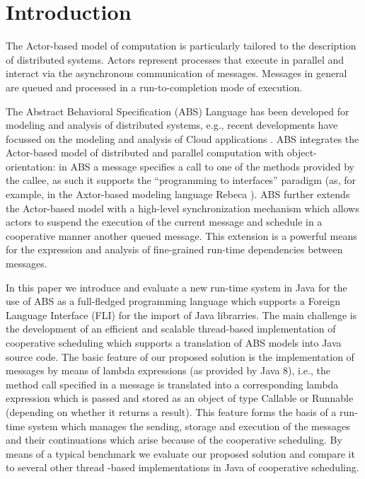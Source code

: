 \section{Introduction}

The Actor-based model of computation \cite{Agha} is particularly tailored to the description of distributed systems.  Actors represent processes that execute in parallel and interact via the asynchronous communication of messages.
Messages in general are queued and processed in a run-to-completion mode of execution.

The  Abstract Behavioral Specification (ABS) \cite{abs}  Language has been developed
for modeling and analysis of distributed systems, e.g., recent developments
have focussed on the modeling and analysis of Cloud applications \cite{Albert}.
 ABS integrates the Actor-based model of distributed and parallel computation with object-orientation:
in ABS a message specifies a  call to one of the methods provided by the callee,
as such it supports the ``programming to interfaces'' paradigm (as, for example, in the Axtor-based modeling language Rebeca \cite{Sirjani}).
ABS further  extends the Actor-based model with  a high-level synchronization mechanism which allows actors to suspend the
execution of the current message and schedule in a cooperative manner another
queued message.  This  extension  is a powerful means for the expression and analysis
of fine-grained run-time dependencies between messages.


In this paper we introduce  and evaluate a new run-time system in Java for  the use of ABS as a full-fledged programming language which supports a Foreign Language Interface (FLI) for the import of Java librarries. The main challenge is the development of an efficient and scalable  thread-based implementation of cooperative scheduling
which supports a translation of ABS models into Java source code.
The basic feature of our proposed solution is the implementation of messages by means of
lambda expressions (as provided by Java 8), i.e., the method call specified in a message
is translated into a corresponding lambda expression which is passed and stored as
an object of type Callable or Runnable (depending on whether it returns  a result).
This  feature forms  the basis of a run-time system which manages
the sending, storage and execution of  the messages and their continuations
which arise because of the cooperative scheduling.
By means of a typical benchmark we evaluate our proposed solution and compare it
to several other thread -based implementations in Java of cooperative scheduling.

